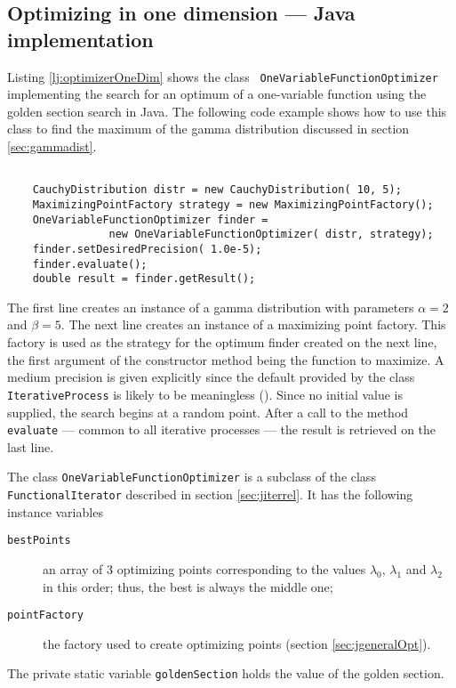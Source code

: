 \documentclass[twoside]{book}
\begin{document}
\subsection{Optimizing in one dimension --- Java implementation}
 Listing
\ref{lj:optimizerOneDim} shows the class {\tt
OneVariableFunctionOptimizer} implementing the search for an
optimum of a one-variable function using the golden section search
in Java. The following code example shows how to use this class to
find the maximum of the gamma distribution discussed in section
\ref{sec:gammadist}.
\begin{codeExample}
\begin{verbatim}

    CauchyDistribution distr = new CauchyDistribution( 10, 5);
    MaximizingPointFactory strategy = new MaximizingPointFactory();
    OneVariableFunctionOptimizer finder =
                new OneVariableFunctionOptimizer( distr, strategy);
    finder.setDesiredPrecision( 1.0e-5);
    finder.evaluate();
    double result = finder.getResult();
\end{verbatim}
\end{codeExample}
The first line creates an instance of a gamma distribution with
parameters $\alpha = 2$ and $\beta = 5$. The next line creates an
instance of a maximizing point factory. This factory is used as
the strategy for the optimum finder created on the next line, the
first argument of the constructor method being the function to
maximize. A medium precision is given explicitly since the default
provided by the class {\tt IterativeProcess} is likely to be
meaningless (\cf \cite{Press}). Since no initial value is
supplied, the search begins at a random point. After a call to the
method {\tt evaluate} --- common to all iterative processes
--- the result is retrieved on the last line.

\noindent The class {\tt OneVariableFunctionOptimizer} is a
subclass of the class {\tt FunctionalIterator} described in
section \ref{sec:jiterrel}. It has the following instance
variables
\begin{description}
  \item[\tt bestPoints] an array of 3 optimizing points corresponding
  to the values $\lambda_0$, $\lambda_1$ and $\lambda_2$ in this order;
  thus, the best is always the middle one;
  \item[\tt pointFactory] the factory used to create optimizing
  points (\cf section \ref{sec:jgeneralOpt}).
\end{description}
The private static variable {\tt goldenSection} holds the value of
the golden section.
\end{document}
